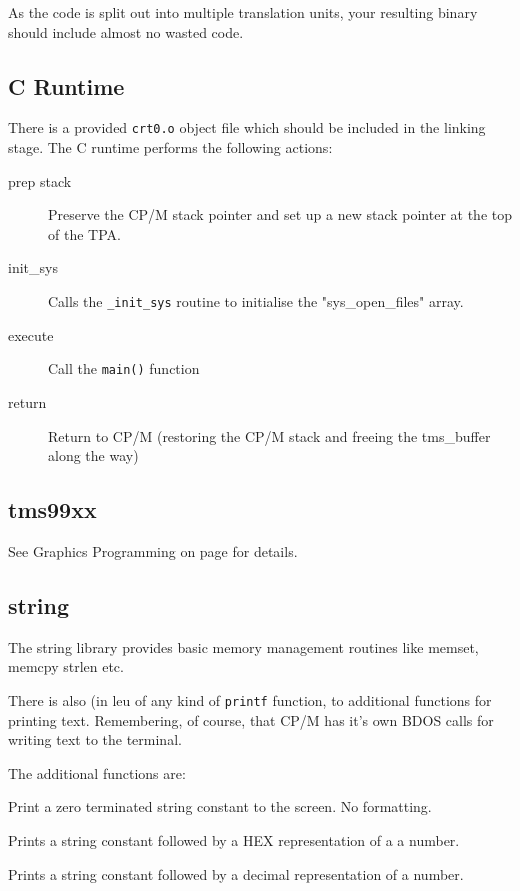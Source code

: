 \documentclass[10pt,a4paper]{article}
\begin{document}
As the code is split out into multiple translation units, your resulting binary
should include almost no wasted code.


\subsection{C Runtime}

There is a provided \texttt{crt0.o} object file which should be included in the
linking stage.  The C runtime performs the following actions:

\begin{description}
  \item[prep stack] Preserve the CP/M stack pointer and set up a new stack
    pointer at the top of the TPA.
  \item[init\_sys] Calls the \texttt{\_init\_sys} routine to initialise the
    "sys\_open\_files" array.
  \item[execute] Call the \texttt{main()} function
  \item[return] Return to CP/M (restoring the CP/M stack and freeing the
    tms\_buffer along the way)
\end{description}

\subsection{tms99xx}

See Graphics Programming on page \pageref{graphicsprogramming} for details.

\subsection{string}

The string library provides basic memory management routines like memset, memcpy
strlen etc.

There is also (in leu of any kind of \texttt{printf} function, to additional
functions for printing text.  Remembering, of course, that CP/M has it's own
BDOS calls for writing text to the terminal.

The additional functions are:

\begin{description}[font=$\bullet$~\normalfont\scshape\color{red!50!black}]
  \item[printstr] Print a zero terminated string constant to the screen.  No
    formatting.
  \item[print\_kvh] Prints a string constant followed by a HEX representation of
    a a number.
  \item[print\_kvd] Prints a string constant followed by a decimal
    representation of a number.
\end{description}
\end{document}
